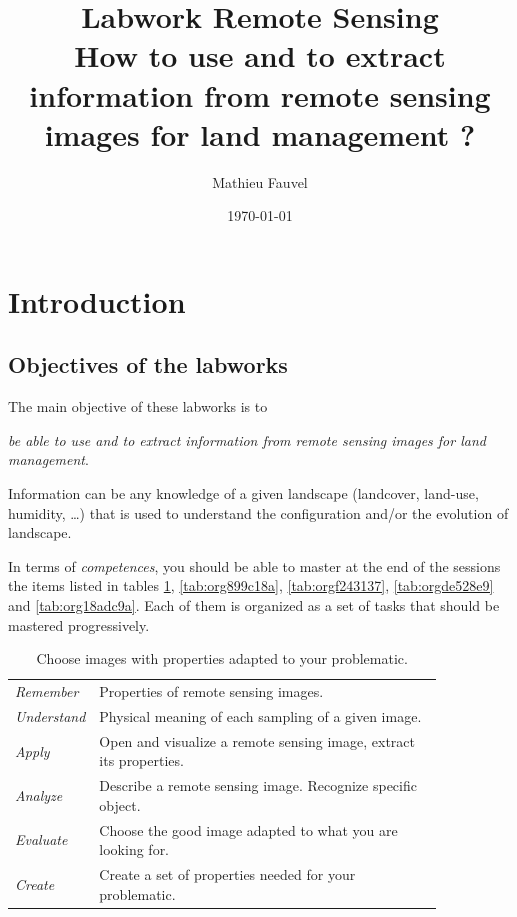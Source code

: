 \documentclass[a4paper,11pt,DIV=18]{scrartcl}
\author{Mathieu Fauvel}
\date{\today}
\title{Labwork Remote Sensing\\\medskip
\large How to use and to extract information from remote sensing images for land management ?}
\begin{document}
\maketitle
\setcounter{tocdepth}{2}
\tableofcontents

\section{Introduction}
\label{sec:org09365d8}
\subsection{Objectives of the labworks}
\label{sec:orgeb448e3}
The main objective of these labworks is to
\begin{center}
\emph{be able to  use and to extract information from  remote sensing images
for land management}.
\end{center}
Information  can be  any knowledge  of a  given landscape  (landcover,
land-use, humidity, \ldots{})  that is used to understand the configuration
and/or the evolution of landscape.

In terms of  \emph{competences}, you should be  able to master at  the end of
the sessions  the items listed in  tables \ref{tab:org4bc790c}, \ref{tab:org899c18a}, \ref{tab:orgf243137},  \ref{tab:orgde528e9} and \ref{tab:org18adc9a}.
Each of them  is organized as a  set of tasks that  should be mastered
progressively.

\begin{table}[htbp]
\caption{\label{tab:org4bc790c}
Choose images with properties adapted to your problematic.}
\centering
\begin{tabular}{lp{0.85\linewidth}}
\toprule
\emph{Remember} & Properties of remote sensing images.\\
\emph{Understand} & Physical meaning of each sampling of a given image.\\
\emph{Apply} & Open and visualize a remote sensing image, extract its properties.\\
\emph{Analyze} & Describe a remote sensing image. Recognize specific object.\\
\emph{Evaluate} & Choose the good image adapted to what you are looking for.\\
\emph{Create} & Create a set of properties needed for your problematic.\\
\bottomrule
\end{tabular}
\end{table}
\end{document}

